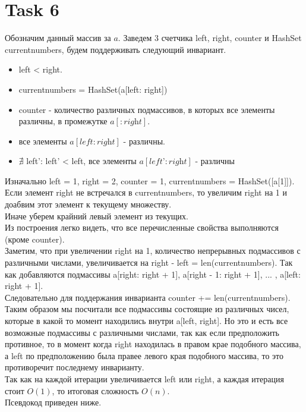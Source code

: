 \documentclass[12pt]{exam}
\begin{document}
\section*{Task 6}
Обозначим данный массив за $a$.
Заведем 3 счетчика left, right, counter и HashSet currentnumbers, будем поддерживать следующий инвариант.
\begin{itemize}
    \item left < right.
    \item currentnumbers = HashSet(a[left: right])
    \item counter - количество различных подмассивов, 
        в которых все элементы различны, в промежутке $a[:\textit{right}]$.
    \item все элементы $a[\textit{left}: \textit{right}]$ - различны.
    \item  $\nexists$ left': left' < left, все элементы $a[\textit{left'}: \textit{right}]$ - различны
\end{itemize}
Изначально left = 1, right = 2, counter = 1, currentnumbers = HashSet([a[1]]). \\
Если элемент right не встречался в currentnumbers, то увеличим right на 1 и доабвим этот элемент к текущему множеству. \\
Иначе уберем крайний левый элемент из текущих. \\
Из построения легко видеть, что все перечисленные свойства выполняются (кроме counter). \\
Заметим, что при увеличении right на 1, количество непрерывных подмассивов с различными числами, 
увеличивается на right - left = len(currentnumbers). Так как добавляются подмассивы 
a[right: right + 1], a[right - 1: right + 1], ... , a[left: right + 1]. \\
Следовательно для поддержания инварианта counter += len(currentnumbers).
Таким образом мы посчитали все подмассивы состоящие из различных чисел, которые в какой то момент 
находились внутри a[left, right]. 
Но это и есть все возможные подмассивы с различными числами, 
так как если предположить противное, то в момент когда right находилась в правом крае подобного массива, 
а left по предположению была правее левого края подобного массива, то это противоречит последнему инварианту. \\
Так как на каждой итерации увеличивается left или right, а каждая итерация стоит $O(1)$, 
то итоговая сложность $O(n)$. \\
Псевдокод приведен ниже.
\end{document}
